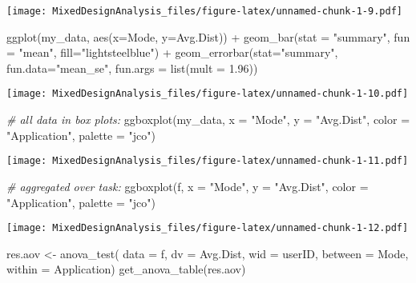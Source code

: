 \documentclass[
]{article}
\newenvironment{Shaded}{\begin{snugshade}}{\end{snugshade}}
\newcommand{\AttributeTok}[1]{\textcolor[rgb]{0.77,0.63,0.00}{#1}}
\newcommand{\CommentTok}[1]{\textcolor[rgb]{0.56,0.35,0.01}{\textit{#1}}}
\newcommand{\FloatTok}[1]{\textcolor[rgb]{0.00,0.00,0.81}{#1}}
\newcommand{\FunctionTok}[1]{\textcolor[rgb]{0.00,0.00,0.00}{#1}}
\newcommand{\NormalTok}[1]{#1}
\newcommand{\OtherTok}[1]{\textcolor[rgb]{0.56,0.35,0.01}{#1}}
\newcommand{\SpecialCharTok}[1]{\textcolor[rgb]{0.00,0.00,0.00}{#1}}
\newcommand{\StringTok}[1]{\textcolor[rgb]{0.31,0.60,0.02}{#1}}
\begin{document}
\texttt{[image: MixedDesignAnalysis\_files/figure-latex/unnamed-chunk-1-9.pdf]}

\begin{Shaded}
\begin{Highlighting}[]
\FunctionTok{ggplot}\NormalTok{(my\_data, }\FunctionTok{aes}\NormalTok{(}\AttributeTok{x=}\NormalTok{Mode, }\AttributeTok{y=}\NormalTok{Avg.Dist)) }\SpecialCharTok{+} \FunctionTok{geom\_bar}\NormalTok{(}\AttributeTok{stat =} \StringTok{"summary"}\NormalTok{, }\AttributeTok{fun =} \StringTok{"mean"}\NormalTok{, }\AttributeTok{fill=}\StringTok{"lightsteelblue"}\NormalTok{) }\SpecialCharTok{+} \FunctionTok{geom\_errorbar}\NormalTok{(}\AttributeTok{stat=}\StringTok{"summary"}\NormalTok{, }\AttributeTok{fun.data=}\StringTok{"mean\_se"}\NormalTok{, }\AttributeTok{fun.args =} \FunctionTok{list}\NormalTok{(}\AttributeTok{mult =} \FloatTok{1.96}\NormalTok{))}
\end{Highlighting}
\end{Shaded}

\texttt{[image: MixedDesignAnalysis\_files/figure-latex/unnamed-chunk-1-10.pdf]}

\begin{Shaded}
\begin{Highlighting}[]
\CommentTok{\# all data in box plots: }
\FunctionTok{ggboxplot}\NormalTok{(my\_data, }\AttributeTok{x =} \StringTok{"Mode"}\NormalTok{, }\AttributeTok{y =} \StringTok{"Avg.Dist"}\NormalTok{, }\AttributeTok{color =} \StringTok{"Application"}\NormalTok{, }\AttributeTok{palette =} \StringTok{"jco"}\NormalTok{)}
\end{Highlighting}
\end{Shaded}

\texttt{[image: MixedDesignAnalysis\_files/figure-latex/unnamed-chunk-1-11.pdf]}

\begin{Shaded}
\begin{Highlighting}[]
\CommentTok{\# aggregated over task: }
\FunctionTok{ggboxplot}\NormalTok{(f, }\AttributeTok{x =} \StringTok{"Mode"}\NormalTok{, }\AttributeTok{y =} \StringTok{"Avg.Dist"}\NormalTok{, }\AttributeTok{color =} \StringTok{"Application"}\NormalTok{, }\AttributeTok{palette =} \StringTok{"jco"}\NormalTok{)}
\end{Highlighting}
\end{Shaded}

\texttt{[image: MixedDesignAnalysis\_files/figure-latex/unnamed-chunk-1-12.pdf]}

\begin{Shaded}
\begin{Highlighting}[]
\NormalTok{res.aov }\OtherTok{\textless{}{-}} \FunctionTok{anova\_test}\NormalTok{( }\AttributeTok{data =}\NormalTok{ f, }\AttributeTok{dv =}\NormalTok{ Avg.Dist, }\AttributeTok{wid =}\NormalTok{ userID, }\AttributeTok{between =}\NormalTok{ Mode, }\AttributeTok{within =}\NormalTok{ Application)}
\FunctionTok{get\_anova\_table}\NormalTok{(res.aov)}
\end{Highlighting}
\end{Shaded}
\end{document}

